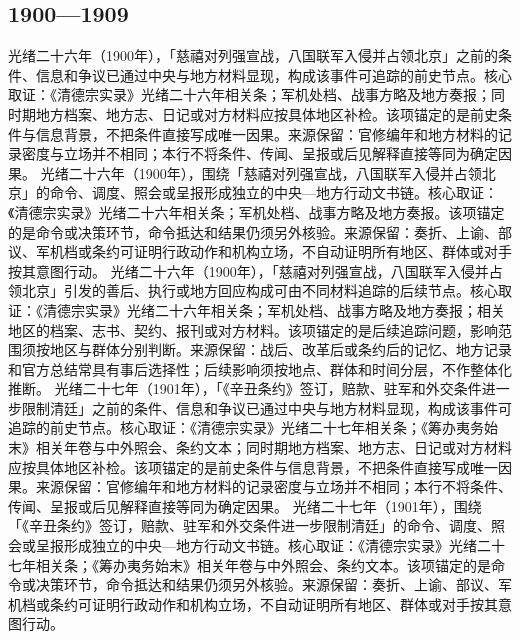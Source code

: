 \subsection{1900—1909}
光绪二十六年（1900年），「慈禧对列强宣战，八国联军入侵并占领北京」之前的条件、信息和争议已通过中央与地方材料显现，构成该事件可追踪的前史节点。核心取证：《清德宗实录》光绪二十六年相关条；军机处档、战事方略及地方奏报；同时期地方档案、地方志、日记或对方材料应按具体地区补检。该项锚定的是前史条件与信息背景，不把条件直接写成唯一因果。来源保留：官修编年和地方材料的记录密度与立场并不相同；本行不将条件、传闻、呈报或后见解释直接等同为确定因果。
光绪二十六年（1900年），围绕「慈禧对列强宣战，八国联军入侵并占领北京」的命令、调度、照会或呈报形成独立的中央—地方行动文书链。核心取证：《清德宗实录》光绪二十六年相关条；军机处档、战事方略及地方奏报。该项锚定的是命令或决策环节，命令抵达和结果仍须另外核验。来源保留：奏折、上谕、部议、军机档或条约可证明行政动作和机构立场，不自动证明所有地区、群体或对手按其意图行动。
光绪二十六年（1900年），「慈禧对列强宣战，八国联军入侵并占领北京」引发的善后、执行或地方回应构成可由不同材料追踪的后续节点。核心取证：《清德宗实录》光绪二十六年相关条；军机处档、战事方略及地方奏报；相关地区的档案、志书、契约、报刊或对方材料。该项锚定的是后续追踪问题，影响范围须按地区与群体分别判断。来源保留：战后、改革后或条约后的记忆、地方记录和官方总结常具有事后选择性；后续影响须按地点、群体和时间分层，不作整体化推断。
光绪二十七年（1901年），「《辛丑条约》签订，赔款、驻军和外交条件进一步限制清廷」之前的条件、信息和争议已通过中央与地方材料显现，构成该事件可追踪的前史节点。核心取证：《清德宗实录》光绪二十七年相关条；《筹办夷务始末》相关年卷与中外照会、条约文本；同时期地方档案、地方志、日记或对方材料应按具体地区补检。该项锚定的是前史条件与信息背景，不把条件直接写成唯一因果。来源保留：官修编年和地方材料的记录密度与立场并不相同；本行不将条件、传闻、呈报或后见解释直接等同为确定因果。
光绪二十七年（1901年），围绕「《辛丑条约》签订，赔款、驻军和外交条件进一步限制清廷」的命令、调度、照会或呈报形成独立的中央—地方行动文书链。核心取证：《清德宗实录》光绪二十七年相关条；《筹办夷务始末》相关年卷与中外照会、条约文本。该项锚定的是命令或决策环节，命令抵达和结果仍须另外核验。来源保留：奏折、上谕、部议、军机档或条约可证明行政动作和机构立场，不自动证明所有地区、群体或对手按其意图行动。
